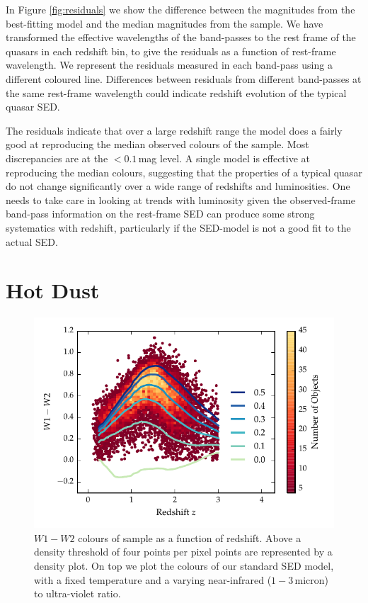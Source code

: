 In Figure \ref{fig:residuals} we show the difference between the magnitudes from the best-fitting model and the median magnitudes from the sample. 
We have transformed the effective wavelengths of the band-passes to the rest frame of the quasars in each redshift bin, to give the residuals as a function of rest-frame wavelength. 
We represent the residuals measured in each band-pass using a different coloured line. 
Differences between residuals from different band-passes at the same rest-frame wavelength could indicate redshift evolution of the typical quasar SED. 

The residuals indicate that over a large redshift range the model does a fairly good at reproducing the median observed colours of the sample. 
Most discrepancies are at the $<0.1$\,mag level. 
A single model is effective at reproducing the median colours, suggesting that the properties of a typical quasar do not change significantly over a wide range of redshifts and luminosities. 
One needs to take care in looking at trends with luminosity given the observed-frame band-pass information on the rest-frame SED can produce some strong systematics with redshift, particularly if the SED-model is not a good fit to the actual SED.

\section{Hot Dust}

\begin{figure}
\centering
\includegraphics[width=\columnwidth]{figures/chapter05/w1w2_versus_redshift_ratio.pdf}
\caption[{$W1 - W2$ colours of sample as a function of redshift.}]{$W1 - W2$ colours of sample as a function of redshift. Above a density threshold of four points per pixel points are represented by a density plot. On top we plot the colours of our standard SED model, with a fixed temperature and a varying near-infrared ($1 - 3$\,micron) to ultra-violet ratio.}
  \label{fig:w1w2colorsratio}
\end{figure}

